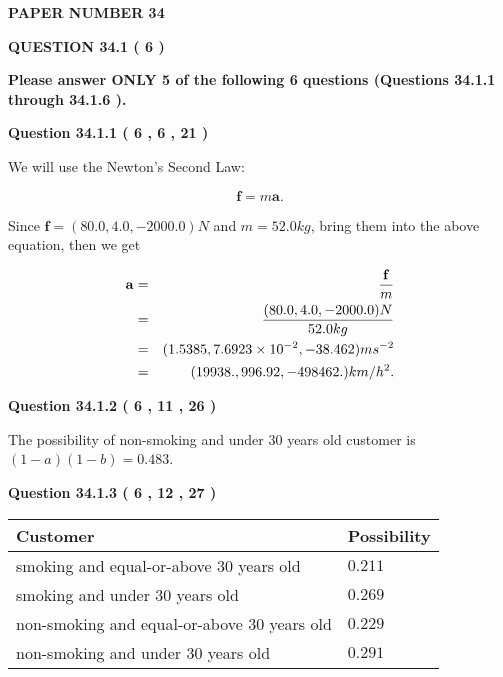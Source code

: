 \documentclass[12pt]{article}
\begin{document}
   
   
   
\newpage 
\setcounter{page}{ 
    34001 } 
   
   
 {\textbf{ \Large{ PAPER NUMBER           34  }}}
   
   
   
   
  
\vspace{0.2in}
  
{\textbf{\Large{QUESTION
34.1 
 (           6 )
}}}
  
  
{\textbf{\Large{Please answer ONLY  %
           5  %
 of the following  %
           6  %
 questions (Questions  %
34.1.1 %
 through  %
34.1.6 %
 ). }}}
   
   
  
  
{\textbf{\large{Question
34.1.1 
 (           6 ,           6 ,          21 )
}}}

We will use the Newton's Second Law:
 
\[
\mathbf{f}=m\mathbf{a}.
\]
 
Since $\mathbf{f}=( %
80.0,  %
4.0,  %
-2000.0 )N$
and $m= %
52.0 kg$, bring them into the above equation, then we get
 
\begin{eqnarray*}
\mathbf{a}&=&\frac{\mathbf{f}}m  \\
&=&\frac{(
80.0 ,
4.0 ,
-2000.0 )N
}{ %
52.0 kg}  \\
&=&(
1.5385 ,
7.6923 \times 10^{-2},
-38.462
)ms^{-2} \\
&=&(
19938. ,
996.92 ,
-498462.
)km/h^2.
\end{eqnarray*}
 
  
  
{\textbf{\large{Question
34.1.2 
 (           6 ,          11 ,          26 )
}}}

The possibility of  %
 non-smoking and  %
under 30 years old
customer is $ (1-a)(1-b) =  %
0.483 $.
  
  
{\textbf{\large{Question
34.1.3 
 (           6 ,          12 ,          27 )
}}}

 
\noindent
\begin{tabular}{|l|l|}
\hline
Customer & Possibility \\
\hline
smoking  and  %
equal-or-above 30 years old &
  $ %
0.211$ \\
\hline
smoking  and  %
under 30 years old &
  $ %
0.269$ \\
\hline
 non-smoking and  %
equal-or-above 30 years old &
  $ %
0.229$ \\
\hline
 non-smoking and  %
under 30 years old &
  $ %
0.291$ \\
\hline
\end{tabular}
 
\end{document}
